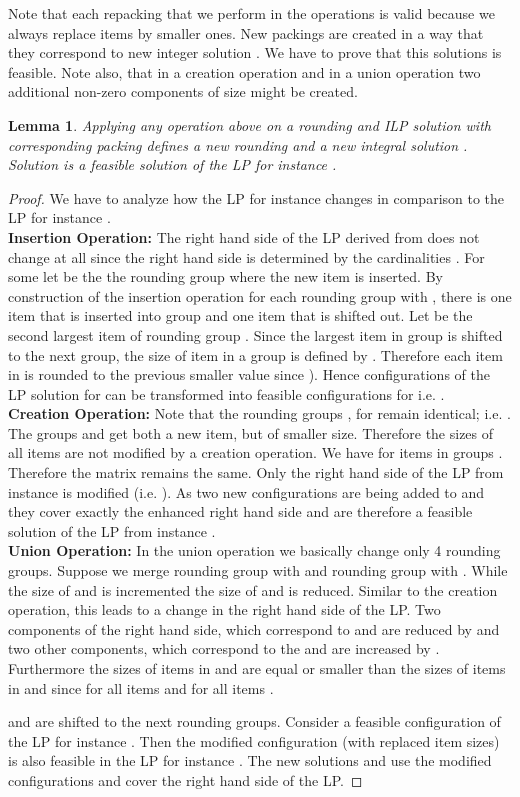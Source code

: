 \documentclass[a4paper,11pt]{article}
\newtheorem{lem}[thm]{Lemma}
\begin{document}
Note that each repacking that we perform in the operations is valid because we always replace items by smaller ones.
New packings  are created in a way that they correspond to new integer solution . We have to prove that
this solutions  is feasible. Note also, that in a creation operation and in a union operation two additional
non-zero components of size  might be created.
\begin{lem}\label{lem12}
	Applying any operation above on a rounding  and ILP solution  with corresponding packing  defines
	a new rounding  and a new integral solution . Solution  is a feasible solution of the LP
	for instance .
\end{lem}
\begin{proof}
	We have to analyze how the LP for instance  changes in comparison to the LP for instance .
	\\{\bf Insertion Operation:} The right hand side of the LP derived from  does not change at all since
	the right hand side is determined by the cardinalities . 
	For some  let  be the the rounding group where the new item is inserted.
	By construction of the insertion operation for each rounding group  with , there is
	one item that is inserted into group  and one item that is shifted out.
	Let  be the second largest item of rounding group .
	Since the largest item  in group  is shifted to the next group,
	the size  of item  in a group  is defined by .
	Therefore each item in  is rounded to the previous smaller value since ).
	Hence configurations of the LP solution for  can be transformed into feasible configurations for 
	i.e. .\\
	{\bf Creation Operation:}
	Note that the rounding groups , for  remain identical; i.e. .
	The groups  and  get both a new item, but of smaller size. Therefore the sizes  of all items
	 are not modified by a creation operation. We have  for items in groups 
	. Therefore the matrix  remains the same. Only the right hand side 
	of the LP from instance  is modified (i.e. ).
	As two new configurations are being added to  and  they cover exactly the enhanced right hand side
	and are therefore a feasible solution of the LP from instance .\\
	{\bf Union Operation:}
	In the union operation we basically change only 4 rounding groups. Suppose we merge rounding group  with
	 and rounding group  with . While the size of  and 
	 is incremented the size of  and 
	is reduced. Similar to the creation operation, this leads to a change in the right
	hand side of the LP. Two components of the right hand side, which correspond to 
	and  are reduced by  and two other components, which correspond to the 
	 and  are increased by .
	Furthermore the sizes of items in  and  are equal or smaller than the sizes of
	items in  and  since 
	for all items  and  for all items .
	 
	and  are shifted to the next rounding groups. 
	Consider a feasible configuration  of the LP for instance . Then the modified configuration 
	(with replaced item sizes) is also feasible in the LP for instance . The new solutions  and  use
	the modified configurations and cover the right hand side of the LP.
\end{proof}
\end{document}
